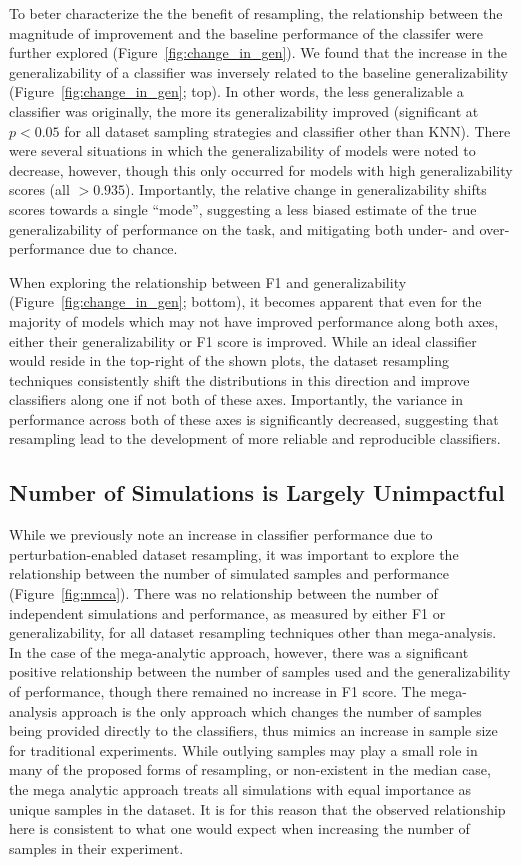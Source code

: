 \documentclass[10pt]{SelfArx} %
\begin{document}
To beter characterize the the benefit of resampling, the relationship between the magnitude of improvement and the
baseline performance of the classifer were further explored (Figure~\ref{fig:change_in_gen}). We found that the
increase in the generalizability of a classifier was inversely related to the baseline generalizability
(Figure~\ref{fig:change_in_gen}; top). In other words, the less generalizable a classifier was originally, the more its
generalizability improved (significant at $p < 0.05$ for all dataset sampling strategies and classifier other than
KNN). There were several situations in which the generalizability of models were noted to decrease, however, though
this only occurred for models with high generalizability scores (all $>0.935$). Importantly, the relative change in
generalizability shifts scores towards a single ``mode'', suggesting a less biased estimate of the true
generalizability of performance on the task, and mitigating both under- and over-performance due to chance.

When exploring the relationship between F1 and generalizability (Figure~\ref{fig:change_in_gen}; bottom), it becomes
apparent that even for the majority of models which may not have improved performance along both axes, either their
generalizability or F1 score is improved. While an ideal classifier would reside in the top-right of the shown plots,
the dataset resampling techniques consistently shift the distributions in this direction and improve classifiers along
one if not both of these axes. Importantly, the variance in performance across both of these axes is significantly
decreased, suggesting that resampling lead to the development of more reliable and reproducible classifiers.

\subsection*{Number of Simulations is Largely Unimpactful}

While we previously note an increase in classifier performance due to perturbation-enabled dataset resampling, it was
important to explore the relationship between the number of simulated samples and performance (Figure~\ref{fig:nmca}).
There was no relationship between the number of independent simulations and performance, as measured by either F1 or
generalizability, for all dataset resampling techniques other than mega-analysis. In the case of the mega-analytic
approach, however, there was a significant positive relationship between the number of samples used and the
generalizability of performance, though there remained no increase in F1 score. The mega-analysis approach is the only
approach which changes the number of samples being provided directly to the classifiers, thus mimics an increase in
sample size for traditional experiments. While outlying samples may play a small role in many of the proposed forms of
resampling, or non-existent in the median case, the mega analytic approach treats all simulations with equal importance
as unique samples in the dataset. It is for this reason that the observed relationship here is consistent to what one
would expect when increasing the number of samples in their experiment.
\end{document}
